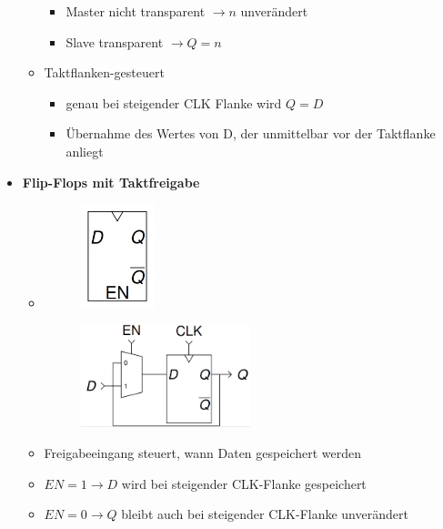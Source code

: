 \documentclass[11pt,a4paper]{article}
\begin{document}
\begin{itemize}
\begin{itemize}
\begin{itemize}
 		\item Master nicht transparent $\rightarrow n$ unverändert
 		\item Slave transparent $\rightarrow Q = n$
 		\end{itemize}
 	\item Taktflanken-gesteuert
 		\vspace{-0.3cm}
 		\begin{itemize}
 		\item genau bei steigender CLK Flanke wird $Q=D$
 		\item Übernahme des Wertes von D, der unmittelbar vor der Taktflanke anliegt
 		\end{itemize}
 	\end{itemize}
 	
\item \textbf{Flip-Flops mit Taktfreigabe}
	\begin{itemize}
	\item[]		
				\begin{minipage}{0.25\textwidth}
					\begin{figure}[H]
					\includegraphics[height=3cm]{Bilder/takt1}
					\end{figure}
				\end{minipage}
				\begin{minipage}[t]{0.6\textwidth}
					\vspace{-2.25cm}
					\begin{figure}[H]
					\includegraphics[height=3cm]{Bilder/takt2}
					\end{figure}
				\end{minipage}
	\end{itemize}
	\begin{itemize}
		\item Freigabeeingang steuert, wann Daten gespeichert werden
		\item $EN = 1 \rightarrow D$ wird bei steigender CLK-Flanke gespeichert
		\item $EN = 0 \rightarrow Q$ bleibt auch bei steigender CLK-Flanke unverändert
 	\end{itemize}
 	

\end{itemize}
\end{document}
